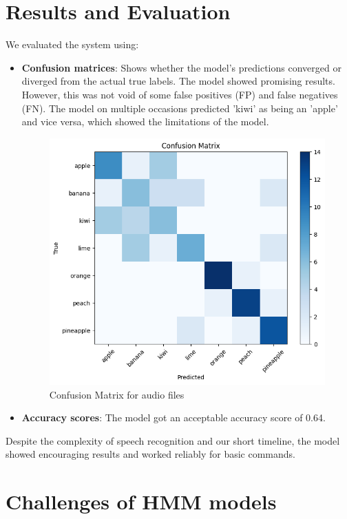 \documentclass[informe,english]{practicaitic}
\begin{document}
\section{Results and Evaluation}
    
    We evaluated the system using:
    \begin{itemize}
        \item \textbf{Confusion matrices}:  Shows whether the model's predictions converged or diverged from the actual true labels.
        The model showed promising results. However, this was not void of some false positives (FP) and false negatives (FN). The model on multiple occasions predicted 'kiwi' as being an 'apple' and vice versa, which showed the limitations of the model.

        \begin{figure}[h!]
            \centering
            \includegraphics[width=0.7\linewidth]{img/conf_matrix.png}
            \caption{Confusion Matrix for audio files}
            \label{fig:enter-label}
        \end{figure}
        
        \item \textbf{Accuracy scores}: The model got an acceptable accuracy score of 0.64.
    \end{itemize}
    
    Despite the complexity of speech recognition and our short timeline, the model showed encouraging results and worked reliably for basic commands.
    
    \section{Challenges of HMM models}
     
\end{document}
